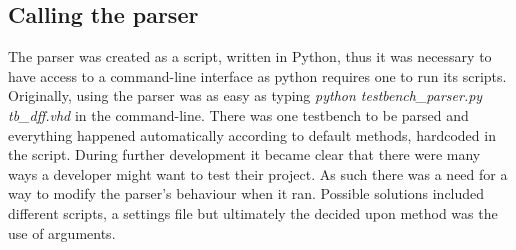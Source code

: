 \documentclass[11pt,british]{article}
\begin{document}
\subsection{Calling the parser}
\label{subsec:parser}
The parser was created as a script, written in Python, thus it was necessary to have access to a command-line interface as python requires one to run its scripts. Originally, using the parser was as easy as typing \emph{python testbench\_parser.py tb\_dff.vhd} in the command-line. There was one testbench to be parsed and everything happened automatically according to default methods, hardcoded in the script. During further development it became clear that there were many ways a developer might want to test their project. As such there was a need for a way to modify the parser's behaviour when it ran. Possible solutions included different scripts, a settings file but ultimately the decided upon method was the use of arguments.
\end{document}

